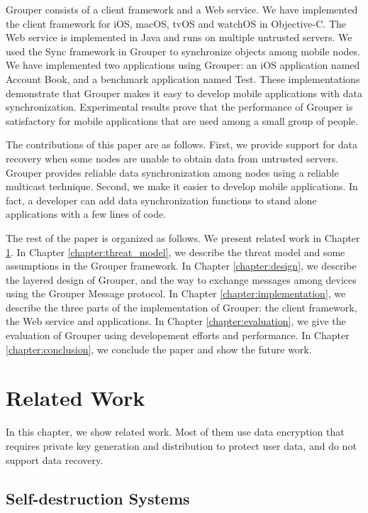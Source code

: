 \documentclass[a4paper,11pt]{report}
\begin{document}
Grouper consists of a client framework and a Web service.
We have implemented the client framework for iOS, macOS, tvOS and watchOS in Objective-C.
The Web service is implemented in Java and runs on multiple untrusted servers.
We used the Sync\cite{sync} framework in Grouper to synchronize objects among mobile nodes.
We have implemented two applications using Grouper: an iOS application named Account Book, and a benchmark application named Test.
These implementations demonstrate that Grouper makes it easy to develop mobile applications with data synchronization.
Experimental results prove that the performance of Grouper is satisfactory for mobile applications that are used among a small group of people.

The contributions of this paper are as follows.
First, we provide support for data recovery when some nodes are unable to obtain data from untrusted servers.
Grouper provides reliable data synchronization among nodes using a reliable multicast technique.
Second, we make it easier to develop mobile applications.
In fact, a developer can add data synchronization functions to stand alone applications with a few lines of code.

The rest of the paper is organized as follows.
We present related work in Chapter \ref{chapter:related_work}.
In Chapter \ref{chapter:threat_model}, we describe the threat model and some assumptions in the Grouper framework.
In Chapter \ref{chapter:design}, we describe the layered design of Grouper, and the way to exchange messages among devices using the Grouper Message protocol.
In Chapter \ref{chapter:implementation}, we describe the three parts of the implementation of Grouper: the client framework, the Web service and applications.
In Chapter \ref{chapter:evaluation}, we give the evaluation of Grouper using developement efforts and performance.
In Chapter \ref{chapter:conclusion}, we conclude the paper and show the future work.

\chapter{Related Work} \label{chapter:related_work}

In this chapter, we show related work. 
Most of them use data encryption that requires private key generation and distribution to protect user data, and do not support data recovery.

\section{Self-destruction Systems}
\end{document}
